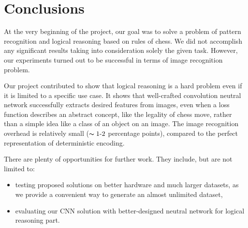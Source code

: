 \documentclass[10pt,twocolumn,letterpaper]{article}
\begin{document}
\section{Conclusions}

At the very beginning of the project, our goal was to solve a problem of pattern
recognition and logical reasoning based on rules of chess. We did not accomplish
any significant results taking into consideration solely the given task.
However, our experiments turned out to be successful in terms of image
recognition problem.

Our project contributed to show that logical reasoning is a hard problem even if
it is limited to a specific use case. It shows that well-crafted convolution
neutral network successfully extracts desired features from images, even when a
loss function describes an abstract concept, like the legality of chess move, rather
than a simple idea like a class of an object on an image. The image recognition
overhead is relatively small ($\thicksim 1 \text{-} 2$ percentage points),
compared to the perfect representation of deterministic encoding.

There are plenty of opportunities for further work. They include, but are not
limited to:
\begin{itemize}
\item testing proposed solutions on better hardware and much larger datasets, as
we provide a convenient way to generate an almost unlimited dataset,
\item evaluating our CNN solution with better-designed neutral network for
logical reasoning part.
\end{itemize}

{\small


}
\end{document}

